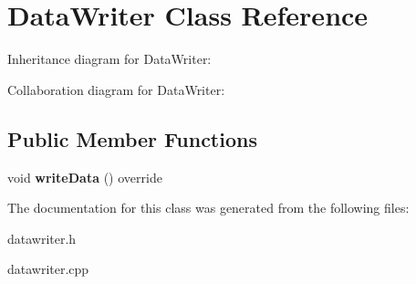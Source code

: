 \hypertarget{classDataWriter}{}\section{Data\+Writer Class Reference}
\label{classDataWriter}


Inheritance diagram for Data\+Writer\+:


Collaboration diagram for Data\+Writer\+:
\subsection*{Public Member Functions}
\begin{DoxyCompactItemize}
\item 
\mbox{\label{classDataWriter_ab9ee7b3b185c5192d90ef34f1c6a8213}} 
void {\bfseries write\+Data} () override
\end{DoxyCompactItemize}


The documentation for this class was generated from the following files\+:\begin{DoxyCompactItemize}
\item 
datawriter.\+h\item 
datawriter.\+cpp\end{DoxyCompactItemize}
